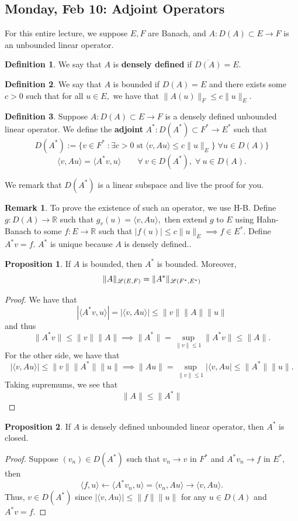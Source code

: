 \documentclass[10pt, oneside]{article}
\newcommand{\bbR}{\mathbb{R}}
\theoremstyle{definition}
\newtheorem{defn}{Definition}
\newtheorem{prop}{Proposition}
\newtheorem{rem}{Remark}
\begin{document}
\subsection{Monday, Feb 10: Adjoint Operators}
For this entire lecture, we suppose $E,F$ are Banach, and $A: D(A)\subset E \to F$ is an unbounded linear operator.
\begin{defn}
We say that $A$ is \textbf{densely defined} if $\overline{D(A)} = E.$
\end{defn}
\begin{defn}
    We say that $A$ is bounded if $D(A) = E$ and there exists some $c>0$ such that for all $u \in E,$ we have that $\|A(u)\|_F \leq c\|u\|_E.$
\end{defn}
\begin{defn}
    Suppose $A: D(A)\subset E \to F$ is a densely defined unbounded linear operator. We define the \textbf{adjoint} $A^*: D(A^*)\subset F^* \to E^*$ such that 
    \[D(A^*) := \{v\in F^* \; : \exists c>0 \text{ st}\; \langle v, Au\rangle \leq c \|u\|_E\} \; \forall u \in D(A)\}\]
    \[\langle v, Au\rangle = \langle A^*v , u\rangle \qquad \forall\:v\in D(A^*), \; \forall \:u\in D(A).\]
\end{defn}
We remark that $D(A^*)$ is a linear subspace and live the proof for you.
\begin{rem}
    To prove the existence of such an operator, we use H-B. Define $g: D(A)\to \bbR$ such that $g_v(u) = \langle v, Au\rangle,$ then extend $g$ to $E$ using Hahn-Banach to some $f: E\to \bbR$ such that $|f(u)|\leq c\|u\|_E \implies f\in E^*.$ Define $A^*v = f.$ $A^*$ is unique because $A$ is densely defined..
\end{rem}
\begin{prop}
    If $A$ is bounded, then $A^*$ is bounded. Moreover, 
    \[\|A\|_{{\cal L}(E, F)}= \|A^*\|_{{\cal L}(F^*, E^*)}\]
\end{prop}
\begin{proof}
    We have that 
    \[|\langle A^*v, u\rangle| = |\langle v, A u\rangle|\leq \|v\|\|A\|\|u\|\]
    and thus 
    \[\|A^*v\|\leq \|v\|\|A\| \implies \|A^*\| = \sup_{\|v\|\leq 1} \|A^* v\| \leq \|A\|.\]
    For the other side, we have that 
    \[|\langle v, A u\rangle|\leq \|v\|\|A^*\|\|u\| \implies \|Au\| = \sup_{\|v\| \leq 1}|\langle v, Au| \leq \|A^*\|\|u\|.\] Taking supremums, we see that 
    \[\|A\|\leq \|A^*\|\]
\end{proof}

\begin{prop}
    If $A$ is densely defined unbounded linear operator, then $A^*$ is closed.
\end{prop}
\begin{proof}
    Suppose $(v_n)\in D(A^*)$ such that $v_n \to v$ in $F^*$ and $A^*v_n \to f$ in $E^*,$
 then 
\[\langle f, u\rangle\leftarrow\langle A^*v_n, u\rangle = \langle v_n, Au\rangle \to \langle v, Au \rangle.\] Thus, $v\in D(A^*)$ since $|\langle v, Au\rangle| \leq \|f\|\|u\|$ for any $u\in D(A)$ and $A^*v = f.$
 \end{proof}
\end{document}
